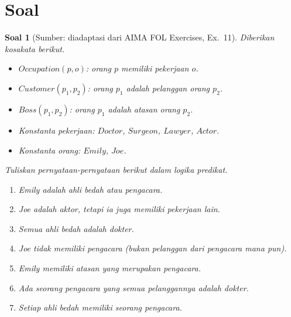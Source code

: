\documentclass[12pt,a4paper]{article}
\theoremstyle{soaljarak}
\newtheorem{soal}{Soal}
\begin{document}
\section*{Soal}

\begin{soal}[\normalfont Sumber: diadaptasi dari AIMA FOL Exercises, Ex.~11]
  Diberikan kosakata berikut.
  \begin{itemize}[leftmargin=*]
    \item \(\mathit{Occupation}(p,o)\): orang \(p\) memiliki pekerjaan \(o\).
    \item \(\mathit{Customer}(p_1,p_2)\): orang \(p_1\) adalah pelanggan orang \(p_2\).
    \item \(\mathit{Boss}(p_1,p_2)\): orang \(p_1\) adalah atasan orang \(p_2\).
    \item Konstanta pekerjaan: \(\mathit{Doctor}\), \(\mathit{Surgeon}\), \(\mathit{Lawyer}\), \(\mathit{Actor}\).
    \item Konstanta orang: \(\mathit{Emily}\), \(\mathit{Joe}\).
  \end{itemize}
  Tuliskan pernyataan-pernyataan berikut dalam logika predikat.
  \begin{enumerate}
    \item Emily adalah ahli bedah atau pengacara.
    \item Joe adalah aktor, tetapi ia juga memiliki pekerjaan lain.
    \item Semua ahli bedah adalah dokter.
    \item Joe tidak memiliki pengacara (bukan pelanggan dari pengacara mana pun).
    \item Emily memiliki atasan yang merupakan pengacara.
    \item Ada seorang pengacara yang semua pelanggannya adalah dokter.
    \item Setiap ahli bedah memiliki seorang pengacara.
  \end{enumerate}
\end{soal}
\end{document}
